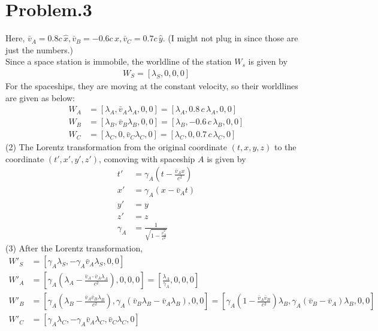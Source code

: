 \documentclass[12pt]{article}
\begin{document}
\section*{Problem.3}
Here, $\bar{v}_A = 0.8c \,\hat{x}, \bar{v}_B = -0.6 c \,\hat{x}, \bar{v}_C = 0.7 c \,\hat{y}$. (I might not plug in since those are just the numbers.)\\
Since a space station is immobile, the worldline of the station $W_s$ is given by
\begin{gather*}
W_S = \left[\lambda_S, 0, 0, 0 \right]
\end{gather*}
For the spaceships, they are moving at the constant velocity, so their worldlines are given as below:
\begin{align*}
W_A &= \left[\lambda_A, \bar{v}_A \lambda_A, 0, 0 \right] = \left[\lambda_A, 0.8 \, c \, \lambda_A, 0, 0 \right] \\[1em]
W_B &= \left[\lambda_B, \bar{v}_B \lambda_B, 0, 0 \right] = \left[\lambda_B, - 0.6 \, c \, \lambda_B, 0, 0 \right] \\[1em]
W_C &= \left[\lambda_C, 0, \bar{v}_C \lambda_C, 0 \right] = \left[\lambda_C, 0, 0.7 \, c \, \lambda_C, 0 \right]
\end{align*}
(2)
The Lorentz transformation from the original coordinate $(t, x, y, z)$ to the coordinate $(t', x', y', z')$, comoving with spaceship $A$ is given by
\begin{align*}
t' &= \gamma_A \left( t - \frac{\bar{v}_A x}{c^2}\right)\\
x' &= \gamma_A \left( x - \bar{v}_A t\right)\\
y' &= y\\
z' &= z\\
\gamma_A &= \frac{1}{\sqrt{1 - \frac{\bar{v}_A^2}{c^2}}}
\end{align*}
(3)
After the Lorentz transformation,
\begin{align*}
W'_S &= \left[\gamma_A \lambda_S, - \gamma_A \bar{v}_A \lambda_S, 0, 0 \right]\\[1em]
W'_A &= \left[\gamma_A \left(\lambda_A  - \frac{\bar{v}_A \cdot \bar{v}_A \lambda_A}{c^2}\right), 0, 0, 0 \right] = \left[\frac{\lambda_A}{\gamma_A}, 0, 0, 0 \right]\\[1em]
W'_B &= \left[\gamma_A \left(\lambda_B - \frac{\bar{v}_A \bar{v}_B \lambda_B}{c^2}\right), \gamma_A \left( \bar{v}_B \lambda_B - \bar{v}_A \lambda_B\right), 0, 0 \right] = \left[\gamma_A \left(1 - \frac{\bar{v}_A \bar{v}_B}{c^2}\right) \lambda_B , \gamma_A \left( \bar{v}_B - \bar{v}_A\right) \lambda_B, 0, 0 \right]\\[1em]
W'_C &= \left[\gamma_A \lambda_C, - \gamma_A \bar{v}_A \lambda_C, \bar{v}_C \lambda_C, 0 \right]
\end{align*}
\end{document}
